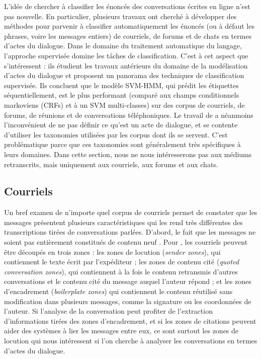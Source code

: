 \documentclass[10pt,a4paper,twoside]{article}
\begin{document}
L'idée de chercher à classifier les énoncés des conversations écrites en ligne n'est pas nouvelle. En particulier, plusieurs travaux ont cherché à développer des méthodes pour parvenir à classifier automatiquement les énoncés (ou à défaut les phrases, voire les messages entiers) de courriels, de forums et de chats en termes d'actes du dialogue. Dans le domaine du traitement automatique du langage, l'approche supervisée domine les tâches de classification. C'est à cet aspect que s'intéressent \citet{tavafi2013dialogue} : ils étudient les travaux antérieurs du domaine de la modélisation d'actes du dialogue et proposent un panorama des techniques de classification supervisée. Ils concluent que le modèle SVM-HMM, qui prédit les étiquettes séquentiellement, est le plus performant (comparé aux champs conditionnels markoviens (CRFs) et à un SVM multi-classes) sur des corpus de courriels, de forums, de réunions et de conversations téléphoniques. Le travail de \citeauthor{tavafi2013dialogue} a néanmoins l'inconvénient de ne pas définir ce qu'est un acte de dialogue, et se contente d'utiliser les taxonomies utilisées par les corpus dont ils se servent. C'est problématique parce que ces taxonomies sont généralement très spécifiques à leurs domaines. Dans cette section, nous ne nous intéresserons pas aux médiums retranscrits, mais uniquement aux courriels, aux forums et aux chats.


\subsection{Courriels}
\label{subsec:emails}

Un bref examen de n'importe quel corpus de courriels permet de constater que les messages présentent plusieurs caractéristiques qui les rend très différentes des transcriptions tirées de conversations parlées. D'abord, le fait que les messages ne soient pas entièrement constitués de contenu \og neuf \fg. Pour \citet{lampert2009segmenting}, les courriels peuvent être découpés en trois zones : les zones de locution (\textit{sender zones}), qui contiennent le texte écrit par l'expéditeur ; les zones de contenu cité (\textit{quoted conversation zones}), qui contiennent à la fois le contenu retransmis d'autres conversations et le contenu cité du message auquel l'auteur répond ; et les zones d'encadrement (\textit{boilerplate zones}) qui contiennent le contenu réutilisé sans modification dans plusieurs messages, comme la signature ou les coordonnées de l'auteur. Si l'analyse de la conversation peut profiter de l'extraction d'informations tirées des zones d'encadrement, et si les zones de citations peuvent aider des systèmes à lier les messages entre eux, ce sont surtout les zones de locution qui nous intéressent si l'on cherche à analyser les conversations en termes d'actes du dialogue.
\end{document}
